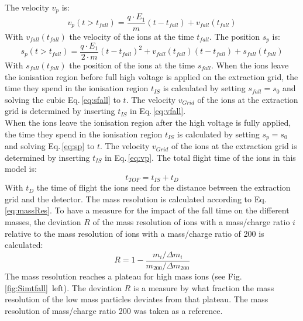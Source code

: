 	The velocity $v_{p}$ is:
	\begin{equation}
		v_{p}(t > t_{fall}) = \frac{q\cdot E_1}{m}(t-t_{fall}) + v_{fall}(t_{fall})
		\label{eq:vp}
	\end{equation}
	With $v_{fall}(t_{fall})$ the velocity of the ions at the time $t_{fall}$. The position $s_{p}$ is:
	\begin{equation}
		s_{p}(t > t_{fall}) = \frac{q\cdot E_1}{2\cdot m}(t-t_{fall})^2 + v_{fall}(t_{fall})(t-t_{fall}) + s_{fall}(t_{fall})
		\label{eq:sp}
	\end{equation}
	With $s_{fall}(t_{fall})$ the position of the ions at the time $s_{fall}$. When the ions leave the ionisation region before full high voltage is applied on the extraction grid, the time they spend in the ionisation region $t_{IS}$ is calculated by setting $s_{fall}=s_0$ and solving the cubic Eq.\,\eqref{eq:sfall} to $t$. The velocity $v_{Grid}$ of the ions at the extraction grid is determined by inserting $t_{IS}$ in Eq.\,\eqref{eq:vfall}.\\
	When the ions leave the ionisation region after the high voltage is fully applied, the time they spend in the ionisation region $t_{IS}$ is calculated by setting $s_{p}=s_0$ and solving Eq.\,\eqref{eq:sp} to $t$. The velocity $v_{Grid}$ of the ions at the extraction grid is determined by inserting $t_{IS}$ in Eq.\,\eqref{eq:vp}. The total flight time of the ions in this model is:
	\begin{equation}
		t_{TOF} = t_{IS} + t_D
	\end{equation}
	With $t_{D}$ the time of flight the ions need for the distance between the extraction grid and the detector. The mass resolution is calculated according to Eq.\,\eqref{eq:massRes}. To have a measure for the impact of the fall time on the different masses, the deviation $R$ of the mass resolution of ions with a mass/charge ratio $i$ relative to the mass resolution of ions with a mass/charge ratio of 200 is calculated:
	\begin{equation}
		R = 1 - \frac{m_i/\Delta m_i}{m_{200}/\Delta m_{200}}
	\end{equation}
	The mass resolution reaches a plateau for high mass ions (see Fig.\,\ref{fig:Simtfall}~left). The deviation $R$ is a measure by what fraction the mass resolution of the low mass particles deviates from that plateau. The mass resolution of mass/charge ratio 200 was taken as a reference.\\
